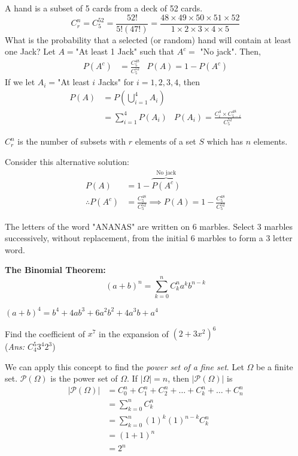 \documentclass{article}
\begin{document}
	\begin{exmp}
		A hand is a subset of 5 cards from a deck of 52 cards.
		$$ C_r^n = C_5^{52} = \frac{52!}{5! (47!)} = \frac{48 \times 49 \times 50 \times 51 \times 52}{1 \times 2 \times 3 \times 4 \times 5}$$
		What is the probability that a selected (or random) hand will contain at least one Jack?
		Let $A = $"At least 1 Jack" such that  $A^c =$ "No jack". Then,
		\begin{align*}
			P(A^c) &= \frac{C^{48}_5}{C^{52}_5} &P(A) = 1-P(A^c)
		\end{align*}
		If we let $A_i = $"At least $i$ Jacks" for $i=1,2,3,4$, then
		\begin{align*}
			P(A) &= P\left( \bigcup_{i=1}^4 A_i \right)  \\
			&= \sum_{i=1}^4 P(A_i) &P(A_i) = \frac{C_i^4 \times C_{5-i}^{48}}{C_{5}^{52}}
		\end{align*}
		\begin{rem}
			$C_r^n$ is the number of subsets with $r$ elements of a set $S$ which has $n$ elements.
		\end{rem}
		Consider this alternative solution:
		\begin{align*}
			P(A) &= 1 - \overbrace{P(A^c)}^{\text{No jack}} \\
			\therefore P(A^c) &= \frac{C_{5}^{48}}{C_5^{52}} \implies P(A) = 1- \frac{C_{5}^{48}}{C_5^{52}} 
		\end{align*}
	\end{exmp}
	\begin{exe}
		The letters of the word "ANANAS" are written on 6 marbles. Select 3 marbles successively, without replacement, from the initial 6 marbles to form a 3 letter word.
	\end{exe}
	\begin{thm}
		\textbf{The Binomial Theorem:}
		$$ (a+b)^n = \sum_{k=0}^n C_k^n a^{k}b^{n-k} $$
	\end{thm}
	\begin{exmp}
		$(a+b)^4 = b^4 + 4ab^3 + 6a^2b^2 + 4a^3 b + a^4$
	\end{exmp}
	\begin{exmp}
		Find the coefficient of $x^7$ in the expansion of $(2+3x^2)^6$ \\
		(\emph{Ans: $C_{4}^5 3^4 2^3$})
	\end{exmp}
	
	We can apply this concept to find the \emph{power set of a fine set}. Let $\Omega$ be a finite set. $\mathcal{P}(\Omega)$ is the power set of $\Omega$. If $|\Omega| = n$, then $|\mathcal{P}(\Omega)|$ is
	\begin{align*}
		|\mathcal{P}(\Omega)| &= C_0^n + C_1^n + C_2^n + \dots + C_k^n + \dots + C_n^n \\
		&= \sum_{k=0}^n C_k^n \\
		&= \sum_{k=0}^n (1)^k (1)^{n-k} C_k^n \\
		&= (1+1)^n \\
		&\boxed{= 2^n}
 	\end{align*}
	
\end{document}
